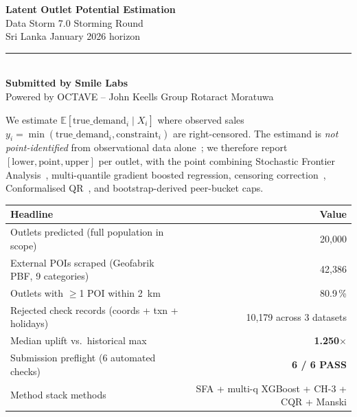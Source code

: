 \documentclass[10pt,a4paper]{article}
\begin{document}

\thispagestyle{empty}
\vspace*{1.2cm}

\begin{center}
{\Huge\bfseries\color{primary} Latent Outlet Potential Estimation}\\[0.3em]
{\Large Data Storm 7.0 \textbar{} Storming Round}\\[0.2em]
{\normalsize Sri Lanka \textbar{} January 2026 horizon}\\[1.6em]

\rule{0.6\textwidth}{0.6pt}\\[0.6em]

{\large\bfseries Submitted by Smile Labs}\\[0.3em]
{\small Powered by OCTAVE -- John Keells Group \textbar{} Rotaract Moratuwa}
\end{center}

\vspace{0.8cm}

\begin{methodbox}[title=\textbf{One-line method}]
We estimate $\mathbb{E}[\text{true\_demand}_i \mid X_i]$ where observed sales
$y_i = \min(\text{true\_demand}_i, \text{constraint}_i)$ are right-censored.
The estimand is \emph{not point-identified} from observational data
alone~\cite{manski2003partial}; we therefore report
$[\text{lower}, \text{point}, \text{upper}]$ per outlet, with the point combining
Stochastic Frontier Analysis~\cite{aigner1977sfa, jondrow1982je}, multi-quantile
gradient boosted regression, censoring correction~\cite{chernozhukov2002hong},
Conformalised QR~\cite{romano2019cqr}, and bootstrap-derived peer-bucket caps.
\end{methodbox}

\vspace{0.4cm}

\begin{center}
\renewcommand{\arraystretch}{1.25}
\begin{tabularx}{0.85\textwidth}{Xr}
\toprule
\rowcolor{soft}\textbf{Headline} & \textbf{Value} \\
\midrule
Outlets predicted (full population in scope)            & 20{,}000 \\
External POIs scraped (Geofabrik PBF, 9 categories)     & 42{,}386 \\
Outlets with $\geq$1 POI within 2~km                    & 80.9\,\% \\
Rejected check records (coords + txn + holidays)        & 10{,}179 across 3 datasets \\
Median uplift vs.\ historical max                        & \textbf{1.250$\times$} \\
Submission preflight (6 automated checks)               & \textbf{6 / 6 PASS} \\
Method stack methods                                    & SFA + multi-q XGBoost + CH-3 + CQR + Manski \\
\bottomrule
\end{tabularx}
\end{center}
\end{document}

